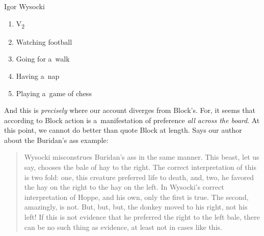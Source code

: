\begin{artengenv}{Igor Wysocki}
\begin{enumerate}[label=(\arabic*)]
\item[]\makebox[-1.7em][l]{}V\textsubscript{2}

\item Watching football

\item Going for a~walk

\item Having a~nap

\item Playing a~game of chess

\end{enumerate}
And this is \textit{precisely} where our account diverges from Block's. For, it seems that according to Block action is a~manifestation of preference \textit{all across the board}. At this point, we cannot do better than quote Block at length. Says our author about the Buridan's ass example:



\begin{quote}
Wysocki misconstrues Buridan's ass in the same manner. This beast, let us say, chooses the bale of hay to the right. The correct interpretation of this is two fold: one, this creature preferred life to death, and, two, he favored the hay on the right to the hay on the left. In Wysocki's correct interpretation of Hoppe, and his own, only the first is true. The second, amazingly, is not. But, but, but, the donkey moved to his right, not his left! If this is not evidence that he preferred the right to the left bale, there can be no such thing as evidence, at least not in cases like this. 
\parencite[][pp.51–52]{block_response_2022}%
\end{quote}





\end{artengenv}
